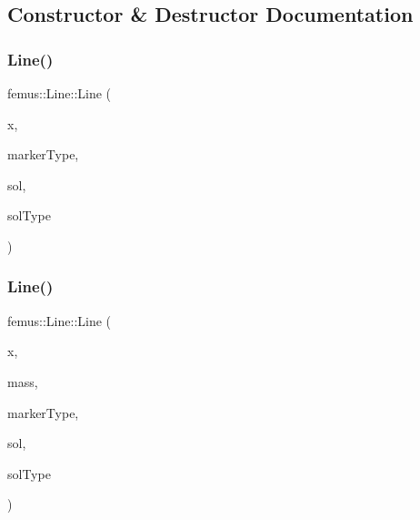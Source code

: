 \subsection{Constructor \& Destructor Documentation}
\mbox{\label{classfemus_1_1_line_aad99c588f3951a674fe69d50f5978d8f}} 
\subsubsection{\texorpdfstring{Line()}{Line()}\hspace{0.1cm}{\footnotesize\ttfamily [1/2]}}
{\footnotesize\ttfamily femus\+::\+Line\+::\+Line (\begin{DoxyParamCaption}\item[{const std\+::vector$<$ std\+::vector$<$ double $>$ $>$}]{x,  }\item[{const std\+::vector$<$ \mbox{\hyperlink{_marker_type_enum_8hpp_ade22213fff69cfb37d8238e8fd3073df}{Marker\+Type}} $>$ \&}]{marker\+Type,  }\item[{\mbox{\hyperlink{classfemus_1_1_solution}{Solution}} $\ast$}]{sol,  }\item[{const unsigned \&}]{sol\+Type }\end{DoxyParamCaption})}

\mbox{\label{classfemus_1_1_line_a21085c1a5d813f311cd7bc984306dc03}} 
\subsubsection{\texorpdfstring{Line()}{Line()}\hspace{0.1cm}{\footnotesize\ttfamily [2/2]}}
{\footnotesize\ttfamily femus\+::\+Line\+::\+Line (\begin{DoxyParamCaption}\item[{const std\+::vector$<$ std\+::vector$<$ double $>$ $>$}]{x,  }\item[{const std\+::vector$<$ double $>$ \&}]{mass,  }\item[{const std\+::vector$<$ \mbox{\hyperlink{_marker_type_enum_8hpp_ade22213fff69cfb37d8238e8fd3073df}{Marker\+Type}} $>$ \&}]{marker\+Type,  }\item[{\mbox{\hyperlink{classfemus_1_1_solution}{Solution}} $\ast$}]{sol,  }\item[{const unsigned \&}]{sol\+Type }\end{DoxyParamCaption})}

